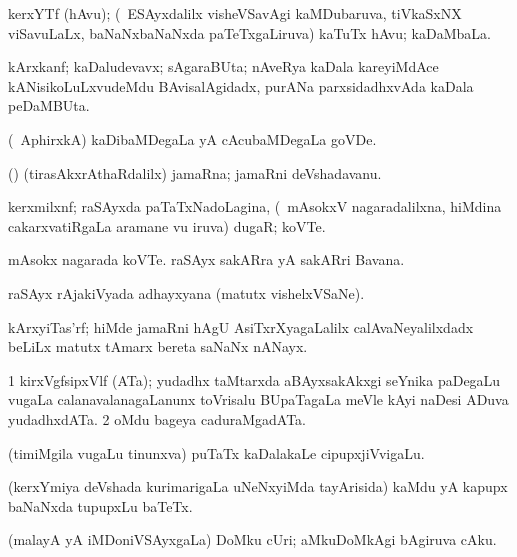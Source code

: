 \bentry
{}
\gl{\nA}
\bmng
kerxYTf (hAvu); (\pU\ ESAyxdalilx visheVSavAgi kaMDubaruva, tiVkaSxNX viSavuLaLx, baNaNxbaNaNxda paTeTxgaLiruva) kaTuTx hAvu; kaDaMbaLa. 
\emng
\eentry

\bentry
{}
\gl{\nA}
\bmng
kArxkanf; kaDaludevavx; sAgaraBUta; nAveRya kaDala kareyiMdAce kANisikoLuLxvudeMdu BAvisalAgidadx, purANa parxsidadhxvAda kaDala peDaMBUta. 
\emng
\eentry

\bentry
{}
\gl{\nA}
\bmng
(\da\ AphirxkA) kaDibaMDegaLa yA cAcubaMDegaLa goVDe. 
\emng
\eentry

\bentry
{}
\gl{\nA}
\bmng
(\ashi) (tirasAkxrAthaRdalilx) jamaRna; jamaRni deVshadavanu. 
\emng
\eentry

\bentry
{}
\gl{\nA}
\bmng
kerxmilxnf; raSAyxda paTaTxNadoLagina, (\kanmu\ mAsokxV nagaradalilxna, hiMdina cakarxvatiRgaLa aramane \mo vu iruva) dugaR; koVTe. 
\emng

\noindent\gl{\pagu}
\bmng
{} 
\banum
{} mAsokx nagarada koVTe. 
 raSAyx sakARra yA sakARri Bavana. 
\eanum
\emng
\eentry

\bentry
{}
\gl{\nA}
\bmng
raSAyx rAjakiVyada adhayxyana (matutx vishelxVSaNe). 
\emng
\eentry

\bentry
{}
\gl{\nA}
\bmng
kArxyiTas'rf; hiMde jamaRni hAgU AsiTxrXyagaLalilx calAvaNeyalilxdadx beLiLx matutx tAmarx bereta saNaNx nANayx. 
\emng
\eentry

\bentry
{}
\gl{\nA}
\bmng
\bnum
\num{1} kirxVgfsipxVlf (ATa); yudadhx taMtarxda aBAyxsakAkxgi seYnika paDegaLu \mo vugaLa calanavalanagaLanunx toVrisalu BUpaTagaLa meVle kAyi naDesi ADuva yudadhxdATa. 
\num{2} oMdu bageya caduraMgadATa. 
\enum
\emng
\eentry

\bentry
{}
\gl{\nA}
\bmng
(timiMgila \mo vugaLu tinunxva) puTaTx kaDalakaLe cipupxjiVvigaLu. 
\emng
\eentry

\bentry
{}
\gl{\nA}
\bmng
(kerxYmiya deVshada kurimarigaLa uNeNxyiMda tayArisida) kaMdu yA kapupx baNaNxda tupupxLu baTeTx. 
\emng
\eentry

\bentry
{}
\gl{\nA}
\bmng
(malayA yA iMDoniVSAyxgaLa) DoMku cUri; aMkuDoMkAgi bAgiruva cAku.   
\emng
\eentry

